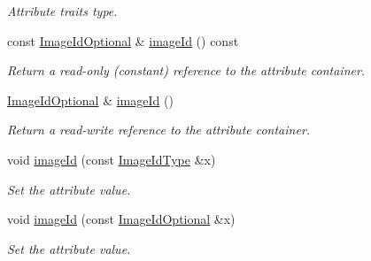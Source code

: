\begin{DoxyCompactItemize}
\begin{DoxyCompactList}\small\item\em Attribute traits type. \item\end{DoxyCompactList}\item 
const \hyperlink{classopenstack_1_1xml_1_1Server_aa8051cfd378e9bbed91d801bde80df3f}{ImageIdOptional} \& \hyperlink{classopenstack_1_1xml_1_1Server_a7e983d2abe6d62516218873579b2c828}{imageId} () const 
\begin{DoxyCompactList}\small\item\em Return a read-\/only (constant) reference to the attribute container. \item\end{DoxyCompactList}\item 
\hyperlink{classopenstack_1_1xml_1_1Server_aa8051cfd378e9bbed91d801bde80df3f}{ImageIdOptional} \& \hyperlink{classopenstack_1_1xml_1_1Server_acd9f83d49cba788de0cb532c32c21f48}{imageId} ()
\begin{DoxyCompactList}\small\item\em Return a read-\/write reference to the attribute container. \item\end{DoxyCompactList}\item 
void \hyperlink{classopenstack_1_1xml_1_1Server_aaf6f7ab037be5848f65ce6b61c500fa5}{imageId} (const \hyperlink{classopenstack_1_1xml_1_1Server_ae297eb5e35deb4ecd622a0a95dfa9626}{ImageIdType} \&x)
\begin{DoxyCompactList}\small\item\em Set the attribute value. \item\end{DoxyCompactList}\item 
void \hyperlink{classopenstack_1_1xml_1_1Server_a0fb9bec033961c5ac774644c7a4ffae1}{imageId} (const \hyperlink{classopenstack_1_1xml_1_1Server_aa8051cfd378e9bbed91d801bde80df3f}{ImageIdOptional} \&x)
\begin{DoxyCompactList}\small\item\em Set the attribute value. \item\end{DoxyCompactList}\end{DoxyCompactItemize}
